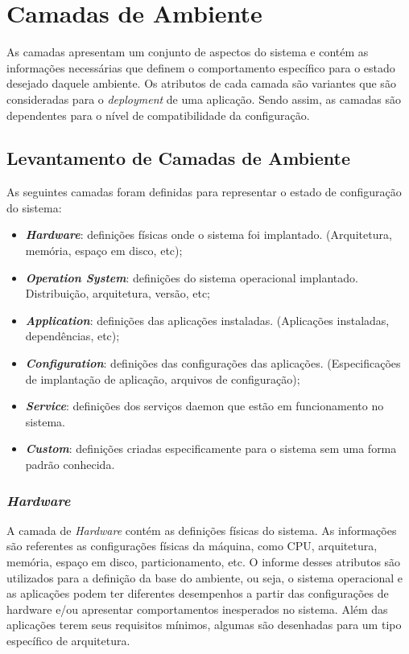 \section{Camadas de Ambiente}
\label{sec:cam-amb}

As camadas apresentam um conjunto de aspectos do sistema e contém as
informações necessárias que definem o comportamento específico para o
estado desejado daquele ambiente. Os atributos de cada camada são variantes
que são consideradas para o \textit{deployment} de uma aplicação. Sendo assim, as
camadas são dependentes para o nível de compatibilidade da configuração.

\subsection{Levantamento de Camadas de Ambiente}
As seguintes camadas foram definidas para representar o estado de configuração do
sistema:
\begin{itemize}
  \item \textit{\textbf{Hardware}}: definições físicas onde o sistema foi implantado.
    (Arquitetura, memória, espaço em disco, etc);
  \item \textit{\textbf{Operation System}}: definições do sistema operacional
    implantado. Distribuição, arquitetura, versão, etc;
  \item \textit{\textbf{Application}}: definições das aplicações instaladas.
    (Aplicações instaladas, dependências, etc);
  \item \textit{\textbf{Configuration}}: definições das configurações das
    aplicações. (Especificações de implantação de aplicação, arquivos
    de configuração);
  \item \textit{\textbf{Service}}: definições dos serviços daemon que estão em
    funcionamento no sistema.
  \item \textit{\textbf{Custom}}: definições criadas especificamente para o
    sistema sem uma forma padrão conhecida.
\end{itemize}

\subsubsection{\textit{Hardware}}
\label{sec:cam-hard}

A camada de \textit{Hardware} contém as definições físicas do sistema.
As informações são referentes as configurações físicas da máquina, como
CPU, arquitetura, memória, espaço em disco, particionamento, etc. O informe desses atributos
são utilizados para a definição da base do ambiente, ou seja, o sistema
operacional e as aplicações podem ter diferentes desempenhos a partir das
configurações de hardware e/ou apresentar comportamentos inesperados no sistema.
Além das aplicações terem seus requisitos mínimos, algumas são desenhadas
para um tipo específico de arquitetura.

